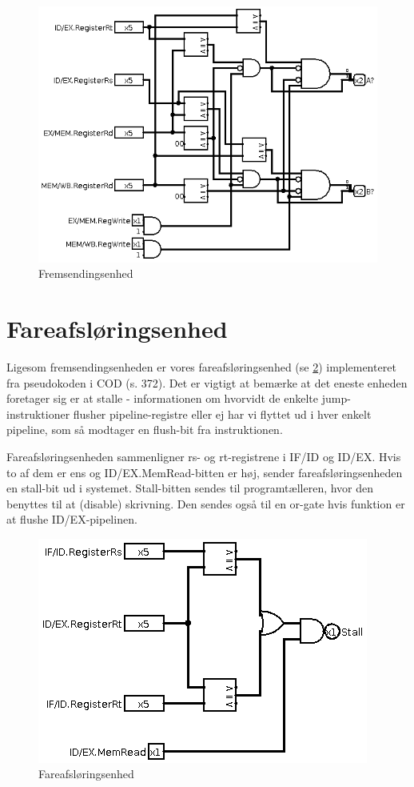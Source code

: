 \documentclass[10pt,a4paper,danish]{article}
\begin{document}
\begin{figure}[htb]
\begin{center}
\leavevmode
\includegraphics[scale=0.70]{forwarding_unit.png}
\end{center}
\caption{Fremsendingsenhed}
\label{fig:fu}
\end{figure}

\section{Fareafsløringsenhed}
Ligesom fremsendingsenheden er vores fareafsløringsenhed (se \ref{fig:hdu})
implementeret fra pseudokoden i COD (s. 372). Det er vigtigt at bemærke at 
det eneste enheden foretager sig er at stalle - informationen om hvorvidt de 
enkelte jump-instruktioner flusher pipeline-registre eller ej har vi flyttet
ud i hver enkelt pipeline, som så modtager en flush-bit fra instruktionen. 

Fareafsløringsenheden sammenligner rs- og rt-registrene i IF/ID og ID/EX. Hvis
to af dem er ens og ID/EX.MemRead-bitten er høj, sender fareafsløringsenheden
en stall-bit ud i systemet. Stall-bitten sendes til programtælleren, hvor den 
benyttes til at (disable) skrivning. Den sendes også til en or-gate hvis 
funktion er at flushe ID/EX-pipelinen. 

\begin{figure}[htb]
\begin{center}
\leavevmode
\includegraphics[scale=0.70]{hazard_detection_unit.png}
\end{center}
\caption{Fareafsløringsenhed}
\label{fig:hdu} 
\end{figure}
\end{document}
